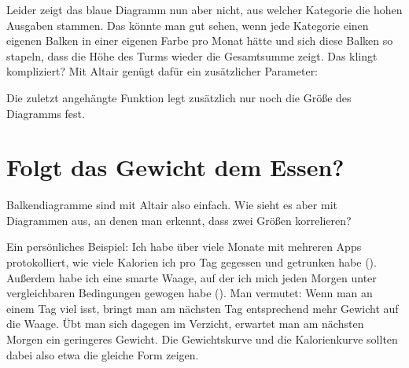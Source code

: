 \medskip




\medskip



Leider zeigt das blaue Diagramm nun aber nicht, aus welcher Kategorie die hohen Ausgaben stammen. Das könnte man gut sehen, wenn jede Kategorie einen eigenen Balken in einer eigenen Farbe pro Monat hätte und sich diese Balken so stapeln, dass die Höhe des Turms wieder die Gesamtsumme zeigt. Das klingt kompliziert? Mit Altair genügt dafür ein zusätzlicher Parameter:

\medskip







\medskip


Die zuletzt angehängte Funktion  legt zusätzlich nur noch die Größe des Diagramms fest.

\section{Folgt das Gewicht dem Essen?}


Balkendiagramme sind mit Altair also einfach. Wie sieht es aber mit Diagrammen aus, an denen man erkennt, dass zwei Größen korrelieren?

Ein persönliches Beispiel: Ich habe über viele Monate mit mehreren Apps protokolliert, wie viele Kalorien ich pro Tag gegessen und getrunken habe (). Außerdem habe ich eine smarte Waage, auf der ich mich jeden Morgen unter vergleichbaren Bedingungen gewogen habe (). Man vermutet: Wenn man an einem Tag viel isst, bringt man am nächsten Tag entsprechend mehr Gewicht auf die Waage. Übt man sich dagegen im Verzicht, erwartet man am nächsten Morgen ein geringeres Gewicht. Die Gewichtskurve und die Kalorienkurve sollten dabei also etwa die gleiche Form zeigen.

